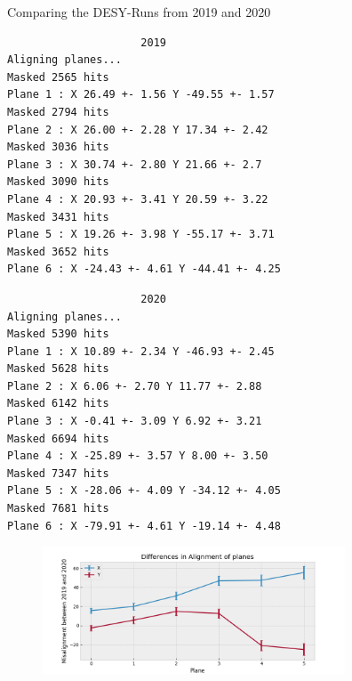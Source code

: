 \documentclass{beamer}
\begin{document}
\begin{frame}[fragile]{Comparing the DESY-Runs from 2019 and 2020}
    \begin{minipage}{.49\textwidth}
	\begin{lstlisting}
                     2019
Aligning planes...
Masked 2565 hits
Plane 1 : X 26.49 +- 1.56 Y -49.55 +- 1.57
Masked 2794 hits
Plane 2 : X 26.00 +- 2.28 Y 17.34 +- 2.42
Masked 3036 hits
Plane 3 : X 30.74 +- 2.80 Y 21.66 +- 2.7
Masked 3090 hits
Plane 4 : X 20.93 +- 3.41 Y 20.59 +- 3.22
Masked 3431 hits
Plane 5 : X 19.26 +- 3.98 Y -55.17 +- 3.71
Masked 3652 hits
Plane 6 : X -24.43 +- 4.61 Y -44.41 +- 4.25
\end{lstlisting}
    \end{minipage}
    \begin{minipage}{.49\textwidth}
	\begin{lstlisting}
                     2020
Aligning planes...
Masked 5390 hits
Plane 1 : X 10.89 +- 2.34 Y -46.93 +- 2.45
Masked 5628 hits
Plane 2 : X 6.06 +- 2.70 Y 11.77 +- 2.88
Masked 6142 hits
Plane 3 : X -0.41 +- 3.09 Y 6.92 +- 3.21
Masked 6694 hits
Plane 4 : X -25.89 +- 3.57 Y 8.00 +- 3.50
Masked 7347 hits
Plane 5 : X -28.06 +- 4.09 Y -34.12 +- 4.05
Masked 7681 hits
Plane 6 : X -79.91 +- 4.61 Y -19.14 +- 4.48
\end{lstlisting}
    \end{minipage}
    \begin{figure}[H]
	\centering
	\includegraphics[trim=0 0 0 18,clip,width=9cm]{Misalignment.png}
    \end{figure}
\end{frame}
\end{document}
